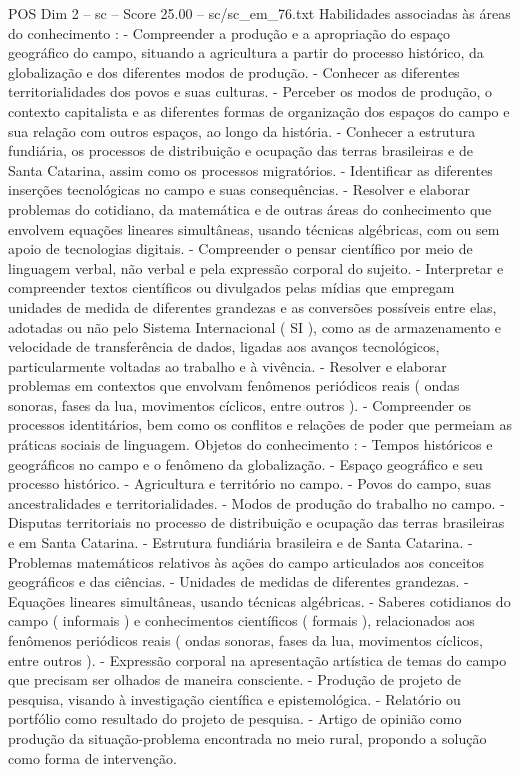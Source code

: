 \begin{textsample}{POS Dim 2 – sc – Score 25.00 – sc/sc\_em\_76.txt}
Habilidades associadas às áreas do conhecimento : - Compreender a produção e a apropriação do espaço geográfico do campo, situando a agricultura a partir do processo histórico, da globalização e dos diferentes modos de produção. - Conhecer as diferentes territorialidades dos povos e suas culturas. - Perceber os modos de produção, o contexto capitalista e as diferentes formas de organização dos espaços do campo e sua relação com outros espaços, ao longo da história. - Conhecer a estrutura fundiária, os processos de distribuição e ocupação das terras brasileiras e de Santa Catarina, assim como os processos migratórios. - Identificar as diferentes inserções tecnológicas no campo e suas consequências. - Resolver e elaborar problemas do cotidiano, da matemática e de outras áreas do conhecimento que envolvem equações lineares simultâneas, usando técnicas algébricas, com ou sem apoio de tecnologias digitais. - Compreender o pensar científico por meio de linguagem verbal, não verbal e pela expressão corporal do sujeito. - Interpretar e compreender textos científicos ou divulgados pelas mídias que empregam unidades de medida de diferentes grandezas e as conversões possíveis entre elas, adotadas ou não pelo Sistema Internacional ( SI ), como as de armazenamento e velocidade de transferência de dados, ligadas aos avanços tecnológicos, particularmente voltadas ao trabalho e à vivência. - Resolver e elaborar problemas em contextos que envolvam fenômenos periódicos reais ( ondas sonoras, fases da lua, movimentos cíclicos, entre outros ). - Compreender os processos identitários, bem como os conflitos e relações de poder que permeiam as práticas sociais de linguagem.
Objetos do conhecimento : - Tempos históricos e geográficos no campo e o fenômeno da globalização. - Espaço geográfico e seu processo histórico. - Agricultura e território no campo. - Povos do campo, suas ancestralidades e territorialidades. - Modos de produção do trabalho no campo. - Disputas territoriais no processo de distribuição e ocupação das terras brasileiras e em Santa Catarina. - Estrutura fundiária brasileira e de Santa Catarina. - Problemas matemáticos relativos às ações do campo articulados aos conceitos geográficos e das ciências. - Unidades de medidas de diferentes grandezas. - Equações lineares simultâneas, usando técnicas algébricas. - Saberes cotidianos do campo ( informais ) e conhecimentos científicos ( formais ), relacionados aos fenômenos periódicos reais ( ondas sonoras, fases da lua, movimentos cíclicos, entre outros ). - Expressão corporal na apresentação artística de temas do campo que precisam ser olhados de maneira consciente. - Produção de projeto de pesquisa, visando à investigação científica e epistemológica. - Relatório ou portfólio como resultado do projeto de pesquisa. - Artigo de opinião como produção da situação-problema encontrada no meio rural, propondo a solução como forma de intervenção.

\end{textsample}
